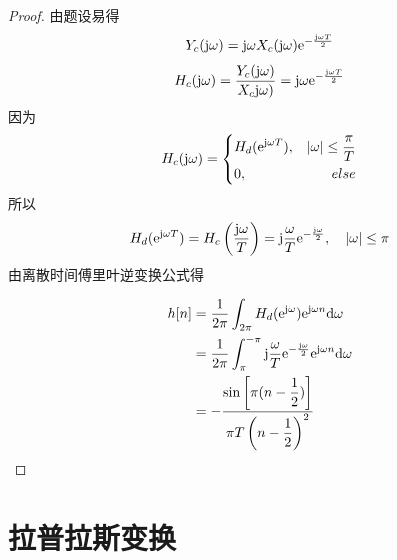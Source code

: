 \begin{proof}

    由题设易得
    $$Y_c(\mathrm{j} \omega) = \mathrm{j} \omega X_c(\mathrm{j} \omega) \mathrm{e}^{-\frac{\mathrm{j} \omega T}{2}}$$
    $$H_c(\mathrm{j} \omega) = \dfrac{Y_c(\mathrm{j} \omega)}{X_c\mathrm{j} \omega)} = \mathrm{j} \omega \mathrm{e}^{-\frac{\mathrm{j} \omega T}{2}}$$
    因为
    $$H_c(\mathrm{j} \omega) = \left\{
        \begin{aligned}
            & H_d(\mathrm{e}^{\mathrm{j} \omega T}), & |\omega| \leq \dfrac{\pi}{T} \\
            & 0, & else 
        \end{aligned}
        \right.
    $$
    所以
    $$H_d(\mathrm{e}^{\mathrm{j} \omega T}) = H_c\left(\dfrac{\mathrm{j} \omega}{T}\right) = \mathrm{j} \dfrac{\omega}{T} \mathrm{e}^{-\frac{\mathrm{j} \omega}{2}}, \quad |\omega| \leq \pi$$
    由离散时间傅里叶逆变换公式得
    
    \begin{align*}
        h[n] & = \dfrac{1}{2\pi} \int_{2\pi}{H_d(\mathrm{e}^{\mathrm{j} \omega})\mathrm{e}^{\mathrm{j} \omega n}}\mathrm{d} \omega \\
        & = \dfrac{1}{2\pi} \int_{\pi}^{-\pi}{\mathrm{j} \dfrac{\omega}{T} \mathrm{e}^{-\frac{\mathrm{j} \omega}{2}} \mathrm{e}^{\mathrm{j} \omega n}}\mathrm{d} \omega \\
        & = - \dfrac{\sin{\left[\pi (n - \dfrac{1}{2})\right]}}{\pi T \left(n - \dfrac{1}{2}\right)^2}
    \end{align*}

\end{proof}

\section{拉普拉斯变换}

